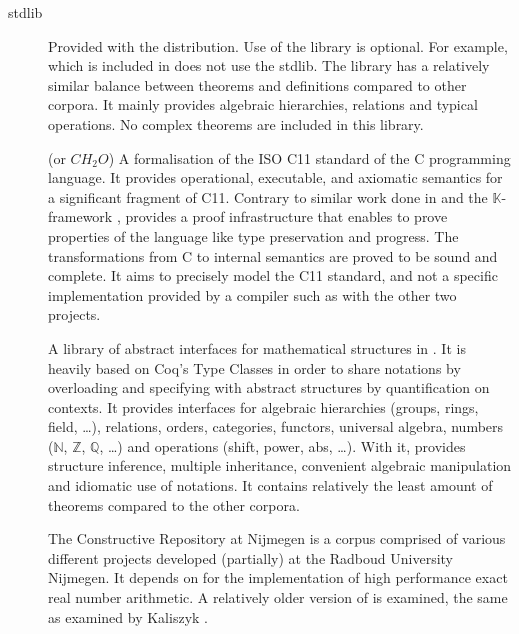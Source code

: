\begin{description}
  \item[\coq stdlib]
    Provided with the \coq distribution.
    Use of the library is optional.
    For example, \ssreflect which is included in \mathcomp does not use the \coq stdlib.
    The library has a relatively similar balance between theorems and definitions compared to other corpora.
    It mainly provides algebraic hierarchies, relations and typical operations.
    No complex theorems are included in this library.

  \item[\formalin]
    (or $CH_2O$) \cite{krebbers2015typed}
    A formalisation of the ISO C11 standard of the C programming language.
    It provides operational, executable, and axiomatic semantics for a significant fragment of C11.
    Contrary to similar work done in \compcert \cite{leroy2009formally} and the $\mathbb{K}$-framework \cite{roșu2010overview}, \formalin provides a proof infrastructure that enables to
    prove properties of the language like type preservation and progress.
    The transformations from C to internal semantics are proved to be sound and complete.
    It aims to precisely model the C11 standard, and not a specific implementation provided by a compiler such as with the other two projects.
  \item[\mathclasses] \cite{spitters2011type} \cite{krebbers2011type} \cite{krebbers2011computer}
    A library of abstract interfaces for mathematical structures in \coq.
    It is heavily based on Coq's Type Classes \cite{sozeau2008first} in order to share notations by overloading and specifying with abstract structures by quantification on contexts.
    It provides interfaces for algebraic hierarchies (groups, rings, field, \ldots),
    relations, orders, categories, functors, universal algebra,
    numbers ($\mathbb{N}$, $\mathbb{Z}$, $\mathbb{Q}$, \ldots)
    and operations (shift, power, abs, \ldots).
    With it, \mathclasses provides structure inference, multiple inheritance, convenient algebraic manipulation
    and idiomatic use of notations.
    It contains relatively the least amount of theorems compared to the other corpora.
  \item[\corn]
    The \coq Constructive Repository at Nijmegen is a corpus comprised of various different projects developed (partially) at the Radboud University Nijmegen.
    It depends on \mathclasses for the implementation of high performance exact real number arithmetic.
    A relatively older version of \corn is examined, the same as examined by Kaliszyk \cite{kaliszyk2014machine}.

\end{description}
